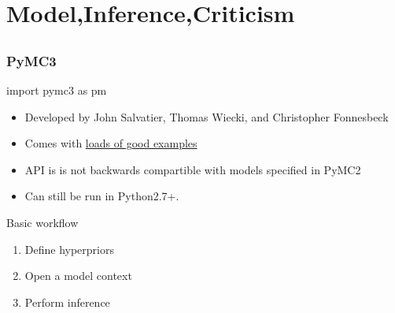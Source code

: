 \documentclass[table,dvipsnames]{beamer}
\newcommand{\highlt}{\textcolor{NavyBlue}}
\begin{document}
\section{Model,Inference,Criticism}
\subsection{}

\begin{frame}[fragile]
\frametitle{PyMC3}
\footnotesize
\begin{code}
import pymc3 as pm
\end{code}

\begin{itemize}
 \item Developed by John Salvatier, Thomas Wiecki, and Christopher Fonnesbeck \citep{Salvatier16}
 \item Comes with \href{https://github.com/pymc-devs/pymc3/tree/master/pymc3/examples}{loads of good examples}
 \item API is is not backwards compartible with models specified in PyMC2
 \item Can still be run in Python2.7+.
\end{itemize}

\highlt{Basic workflow}
\begin{enumerate}
 \item Define hyperpriors
 \item Open a model context
 \item Perform inference
\end{enumerate}
\end{frame}
\end{document}
